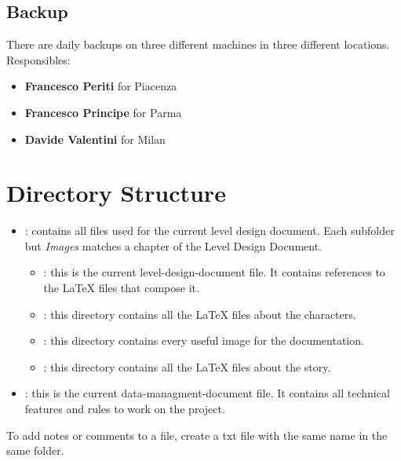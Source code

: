 \documentclass[12pt]{article}
\begin{document}
\subsection{Backup}
There are daily backups on three different machines in three different locations.
Responsibles:
\begin{itemize}
	\item \textbf{Francesco Periti} for Piacenza
	\item \textbf{Francesco Principe} for Parma
	\item \textbf{Davide Valentini} for Milan
\end{itemize}

\section{Directory Structure}
\begin{itemize}
\item \textbf{}: contains all files used for the current level design document. Each subfolder but \textit{Images} matches a chapter of the Level Design Document.
  \begin{itemize}
    \item \textbf{}: this is the current level-design-document file. It contains references to the LaTeX files that compose it.

    \item \textbf{}: this directory contains all the LaTeX files about the characters.

    \item \textbf{}: this directory contains every useful image for the documentation.

    \item \textbf{}: this directory contains all the LaTeX files about the story.
  \end{itemize}
  \item \textbf{}: this is the current data-managment-document file. It contains all technical features and rules to work on the project.
\end{itemize}

To add notes or comments to a file, create a txt file with the same name in the same folder.
\end{document}
